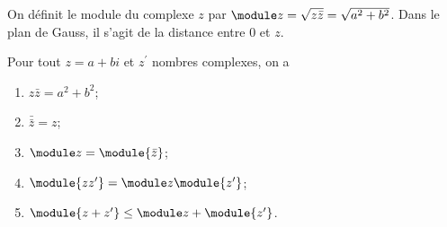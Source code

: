  On définit le module du complexe $z$ par $\module z = \sqrt{z\bar z} =
 \sqrt{a^2 + b^2}$. Dans le plan de Gauss, il s'agit de la distance
 entre $0$ et $z$.

 \begin{proposition}
Pour tout $z = a+bi$ et $z^\prime$ nombres complexes, on a
   \begin{enumerate}
   \item $z \bar z = a^2 + b^2$;
   \item $\bar{\bar{z}} = z$;
   \item $\module z = \module {\bar z}$;
   \item $\module{zz^\prime} = \module z \module{z^\prime}$;
   \item $\module{z+z^\prime} \leq \module z + \module{z^\prime}$.
   \end{enumerate}
 \end{proposition}
